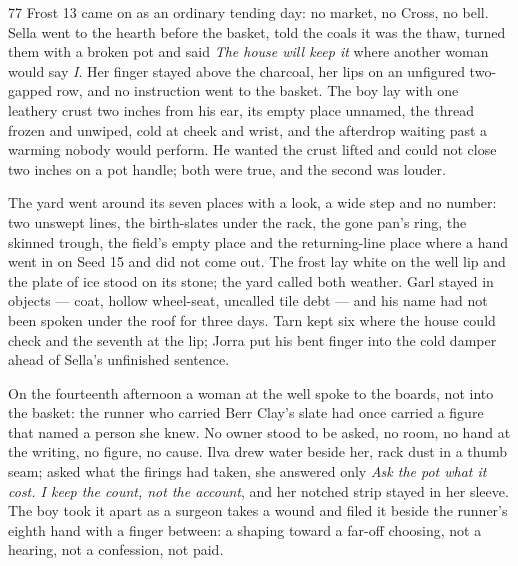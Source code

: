
\scenebreak


\scenebreak


\scenebreak

\CRtailpiece
\begin{CRchronicle}{77}
Frost 13 came on as an ordinary tending day: no market, no Cross, no bell. Sella went to the hearth before the basket, told the coals it was the thaw, turned them with a broken pot and said \emph{The house will keep it} where another woman would say \emph{I}. Her finger stayed above the charcoal, her lips on an unfigured two-gapped row, and no instruction went to the basket. The boy lay with one leathery crust two inches from his ear, its empty place unnamed, the thread frozen and unwiped, cold at cheek and wrist, and the afterdrop waiting past a warming nobody would perform. He wanted the crust lifted and could not close two inches on a pot handle; both were true, and the second was louder.

The yard went around its seven places with a look, a wide step and no number: two unswept lines, the birth-slates under the rack, the gone pan’s ring, the skinned trough, the field’s empty place and the returning-line place where a hand went in on Seed 15 and did not come out. The frost lay white on the well lip and the plate of ice stood on its stone; the yard called both weather. Garl stayed in objects --- coat, hollow wheel-seat, uncalled tile debt --- and his name had not been spoken under the roof for three days. Tarn kept six where the house could check and the seventh at the lip; Jorra put his bent finger into the cold damper ahead of Sella’s unfinished sentence.

On the fourteenth afternoon a woman at the well spoke to the boards, not into the basket: the runner who carried Berr Clay’s slate had once carried a figure that named a person she knew. No owner stood to be asked, no room, no hand at the writing, no figure, no cause. Ilva drew water beside her, rack dust in a thumb seam; asked what the firings had taken, she answered only \emph{Ask the pot what it cost. I keep the count, not the account}, and her notched strip stayed in her sleeve. The boy took it apart as a surgeon takes a wound and filed it beside the runner’s eighth hand with a finger between: a shaping toward a far-off choosing, not a hearing, not a confession, not paid.


\end{CRchronicle}
